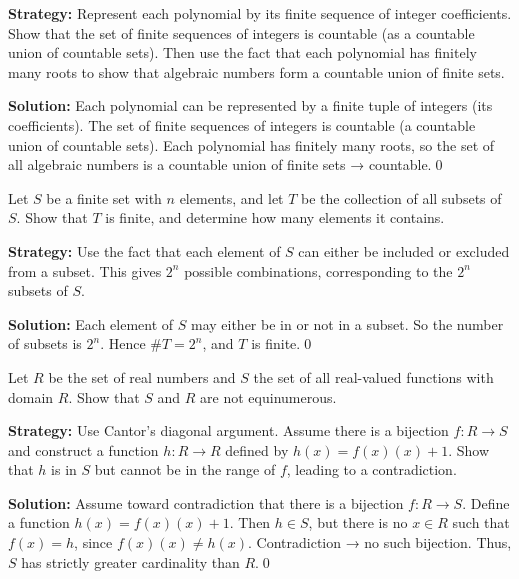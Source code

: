 \noindent\textbf{Strategy:} Represent each polynomial by its finite sequence of integer coefficients. Show that the set of finite sequences of integers is countable (as a countable union of countable sets). Then use the fact that each polynomial has finitely many roots to show that algebraic numbers form a countable union of finite sets.

\bigskip\noindent\textbf{Solution:}  
Each polynomial can be represented by a finite tuple of integers (its coefficients). The set of finite sequences of integers is countable (a countable union of countable sets).  
Each polynomial has finitely many roots, so the set of all algebraic numbers is a countable union of finite sets → countable.\qed



\begin{problembox}
Let \( S \) be a finite set with \( n \) elements, and let \( T \) be the collection of all subsets of \( S \).  
Show that \( T \) is finite, and determine how many elements it contains.
\end{problembox}

\noindent\textbf{Strategy:} Use the fact that each element of $S$ can either be included or excluded from a subset. This gives $2^n$ possible combinations, corresponding to the $2^n$ subsets of $S$.

\bigskip\noindent\textbf{Solution:}  
Each element of \( S \) may either be in or not in a subset.  
So the number of subsets is \( 2^n \). Hence \( \#T = \textbf{$2^n$} \), and \( T \) is finite.\qed



\begin{problembox}
Let \( R \) be the set of real numbers and \( S \) the set of all real-valued functions with domain \( R \).  
Show that \( S \) and \( R \) are not equinumerous.
\end{problembox}

\noindent\textbf{Strategy:} Use Cantor's diagonal argument. Assume there is a bijection $f: R \to S$ and construct a function $h: R \to R$ defined by $h(x) = f(x)(x) + 1$. Show that $h$ is in $S$ but cannot be in the range of $f$, leading to a contradiction.

\bigskip\noindent\textbf{Solution:}  
Assume toward contradiction that there is a bijection \( f: R \to S \).  
Define a function \( h(x) = f(x)(x) + 1 \). Then \( h \in S \), but there is no \( x \in R \) such that \( f(x) = h \), since \( f(x)(x) \ne h(x) \).  
Contradiction → no such bijection. Thus, \( S \) has strictly greater cardinality than \( R \).\qed




